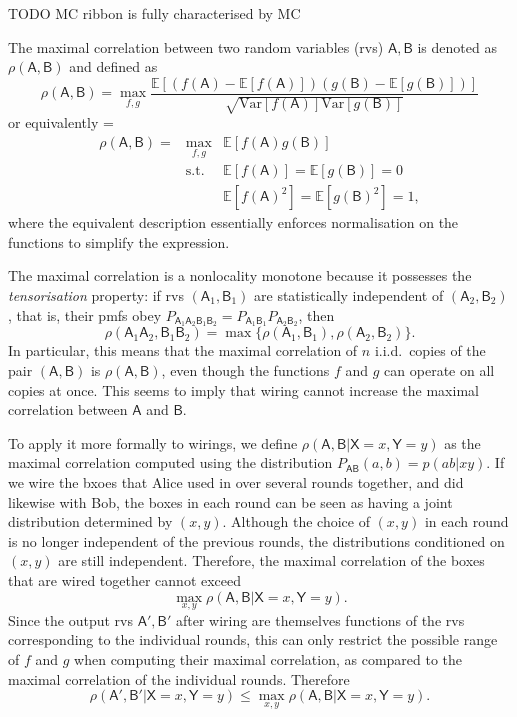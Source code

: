 \documentclass[10pt, a4paper]{article}
\numberwithin{equation}{section} %
\theoremstyle{definition}
\theoremstyle{plain}
\newenvironment{Array}[1] %
{\def\arraystretch{1.75}\everymath={\displaystyle}\begin{equation}\begin{array}{#1}}
{\end{array}\end{equation}}
\newcommand{\?}{\mathrel{?}} %
\newcommand{\E}{\mathbb{E}} %
\newcommand{\Var}{\mathrm{Var}} %
\newcommand{\crv}[1]{\mathsf{#1}}
\begin{document}
    TODO MC ribbon is fully characterised by MC

    The maximal correlation between two random variables (rvs) \(\crv{A},\crv{B}\) is denoted as \(\rho(\crv{A},\crv{B})\) and defined as~\cite{NLMonotones}
    \begin{equation}
      \rho(\crv{A},\crv{B}) = \max_{f,g} \frac{\E[(f(\crv{A})-\E[f(\crv{A})])(g(\crv{B})-\E[g(\crv{B})])]}{\sqrt{\Var[f(\crv{A})]\Var[g(\crv{B})]}}
    \end{equation}
    or equivalently
    \begin{Array}{rcl}
      \rho(\crv{A},\crv{B}) = & \max_{f,g}  & \E[f(\crv{A})g(\crv{B})] \\
                  & \text{s.t.} & \E[f(\crv{A})] = \E[g(\crv{B})] = 0 \\
                  &             & \E[f(\crv{A})^2] = \E[g(\crv{B})^2] = 1,
    \end{Array}
    where the equivalent description essentially enforces normalisation on the functions to simplify the expression.

    The maximal correlation is a nonlocality monotone because it possesses the \emph{tensorisation} property: if rvs \((\crv{A}_1, \crv{B}_1)\) are statistically independent of \((\crv{A}_2,\crv{B}_2)\), that is, their pmfs obey \(P_{\crv{A}_1\crv{A}_2\crv{B}_1\crv{B}_2} = P_{\crv{A}_1\crv{B}_1}P_{\crv{A}_2\crv{B}_2}\), then
    \begin{equation}
      \rho(\crv{A}_1\crv{A}_2,\crv{B}_1\crv{B}_2) = \max\{ \rho(\crv{A}_1,\crv{B}_1), \rho(\crv{A}_2,\crv{B}_2) \}.
    \end{equation}
    In particular, this means that the maximal correlation of \(n\) i.i.d.\ copies of the pair \((\crv{A},\crv{B})\) is \(\rho(\crv{A},\crv{B})\), even though the functions \(f\) and \(g\) can operate on all copies at once. This seems to imply that wiring cannot increase the maximal correlation between \(\crv{A}\) and \(\crv{B}\).

    To apply it more formally to wirings, we define \(\rho(\crv{A},\crv{B}|\crv{X}=x,\crv{Y}=y)\) as the maximal correlation computed using the distribution \(P_{\crv{AB}}(a,b) = p(ab|xy)\). If we wire the bxoes that Alice used in over several rounds together, and did likewise with Bob, the boxes in each round can be seen as having a joint distribution determined by \((x,y)\). Although the choice of \((x,y)\) in each round is no longer independent of the previous rounds, the distributions conditioned on \((x,y)\) are still independent. Therefore, the maximal correlation of the boxes that are wired together cannot exceed
    \[ \max_{x,y} \rho(\crv{A},\crv{B}|\crv{X}=x,\crv{Y}=y). \]
    Since the output rvs \(\crv{A}', \crv{B}'\) after wiring are themselves functions of the rvs corresponding to the individual rounds, this can only restrict the possible range of \(f\) and \(g\) when computing their maximal correlation, as compared to the maximal correlation of the individual rounds. Therefore
    \[ \rho(\crv{A}',\crv{B}'|\crv{X}=x,\crv{Y}=y) \leq \max_{x,y} \rho(\crv{A},\crv{B}|\crv{X}=x,\crv{Y}=y). \]
\end{document}
